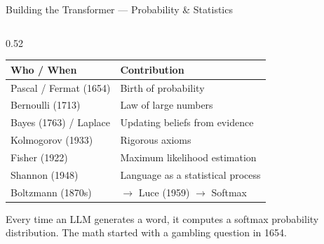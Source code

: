 \begin{frame}[shrink=16]{Building the Transformer --- Probability \& Statistics}
\begin{columns}[T]
    \begin{column}{0.52\textwidth}
      \begin{tcolorbox}[colback=aiViolet!5, colframe=aiViolet,
        fonttitle=\bfseries, title={Section 3 Summary},
        rounded corners, boxrule=1pt, left=4pt, right=4pt, top=3pt, bottom=3pt]
        \footnotesize
        \begin{tabular}{@{}ll@{}}
          \toprule
          \textbf{Who / When} & \textbf{Contribution}\\
          \midrule
          Pascal / Fermat (1654) & Birth of probability\\
          Bernoulli (1713) & Law of large numbers\\
          Bayes (1763) / Laplace & Updating beliefs from evidence\\
          Kolmogorov (1933) & Rigorous axioms\\
          Fisher (1922) & Maximum likelihood estimation\\
          Shannon (1948) & Language as a statistical process\\
          Boltzmann (1870s) & \(\to\) Luce (1959) \(\to\) Softmax\\
          \bottomrule
        \end{tabular}
      \end{tcolorbox}

      \vspace{0.3em}
      \begin{insightbox}
        Every time an LLM generates a word, it computes a softmax
        probability distribution. The math started with a gambling
        question in 1654.
      \end{insightbox}
    \end{column}
  \end{columns}

\end{frame}



